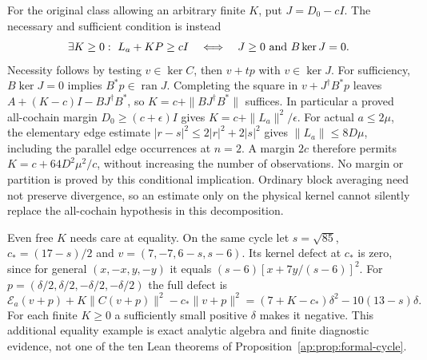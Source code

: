 \documentclass[11pt]{article}
\newcommand{\E}{\mathcal E}
\begin{document}
For the original class allowing an arbitrary finite $K$, put $J=D_0-cI$.
The necessary and sufficient condition is instead
\begin{equation}\label{ap:eq:free-penalty}
 \exists K\geq0:\ L_a+KP\geq cI
 \quad\Longleftrightarrow\quad J\geq0\ \hbox{and }B\ker J=0.
\end{equation}
Necessity follows by testing $v\in\ker C$, then $v+tp$ with $v\in\ker J$.
For sufficiency, $B\ker J=0$ implies $B^*p\in\operatorname{ran}J$.
Completing the square in $v+J^\dagger B^*p$ leaves
$A+(K-c)I-BJ^\dagger B^*$, so $K=c+\|BJ^\dagger B^*\|$ suffices.
In particular a proved all-cochain margin $D_0\geq(c+\epsilon)I$ gives
$K=c+\|L_a\|^2/\epsilon$. For actual $a\leq2\mu$, the elementary edge estimate
$|r-s|^2\leq2|r|^2+2|s|^2$ gives $\|L_a\|\leq8D\mu$, including the parallel
edge occurrences at $n=2$. A margin $2c$ therefore permits
$K=c+64D^2\mu^2/c$, without increasing the number of observations.
No margin or partition is proved by this conditional implication. Ordinary block
averaging need not preserve divergence, so an estimate only on the physical kernel
cannot silently replace the all-cochain hypothesis in this decomposition.

Even free $K$ needs care at equality. On the same cycle let
$s=\sqrt{85}$, $c_*=(17-s)/2$ and $v=(7,-7,6-s,s-6)$. Its kernel defect at $c_*$
is zero, since for general $(x,-x,y,-y)$ it equals
$(s-6)[x+7y/(s-6)]^2$. For
$p=(\delta/2,\delta/2,-\delta/2,-\delta/2)$ the full defect is
\[
 \E_a(v+p)+K\|C(v+p)\|^2-c_*\|v+p\|^2
 =(7+K-c_*)\delta^2-10(13-s)\delta.
\]
For each finite $K\geq0$ a sufficiently small positive $\delta$ makes it negative.
This additional equality example is exact analytic algebra and finite diagnostic
evidence, not one of the ten Lean theorems of Proposition~\ref{ap:prop:formal-cycle}.
\end{document}
